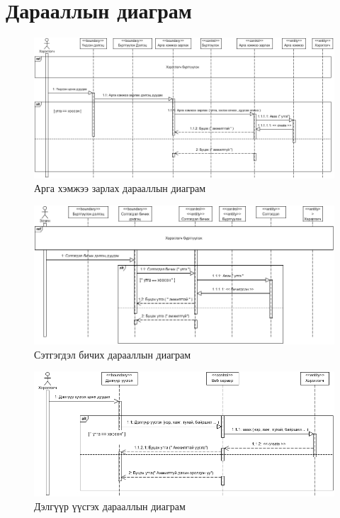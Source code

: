 \section{Дарааллын диаграм }
	\begin{figure}[ht]
		\includegraphics[scale=0.48]{Diagrams/event_s}
		\caption[Арга хэмжээ зарлах дарааллын диаграм]{Арга хэмжээ зарлах дарааллын диаграм}
		\label{text}
	\end{figure}

	\begin{figure}[ht]
		\includegraphics[scale=0.53]{Diagrams/comment_s}
		\caption[Сэтгэгдэл бичих дарааллын диаграм]{Сэтгэгдэл бичих дарааллын диаграм}
		\label{text}
	\end{figure}
	
	\begin{figure}[ht]
		\includegraphics[scale=0.55]{Diagrams/create_s}
		\caption[Дэлгүүр үүсгэх дарааллын диаграм]{Дэлгүүр үүсгэх дарааллын диаграм}
		\label{text}
	\end{figure}


